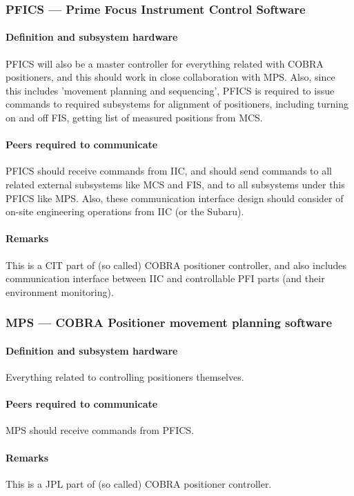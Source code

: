 \documentclass[a4paper,notitlepage]{article}
\begin{document}
\subsubsection{PFICS --- Prime Focus Instrument Control Software}
\paragraph{Definition and subsystem hardware}
PFICS will also be a master controller for everything related with COBRA 
positioners, and this should work in close collaboration with MPS. 
Also, since this includes 'movement planning and sequencing', PFICS is 
required to issue commands to required subsystems for alignment of 
positioners, including turning on and off FIS, getting list of measured 
positions from MCS. 
\paragraph{Peers required to communicate}
PFICS should receive commands from IIC, and should send commands to all related 
external subsystems like MCS and FIS, and to all subsystems under this PFICS 
like MPS. 
Also, these communication interface design should consider of on-site 
engineering operations from IIC (or the Subaru). 
\paragraph{Remarks}
This is a CIT part of (so called) COBRA positioner controller, and also 
includes communication interface between IIC and controllable PFI parts (and 
their environment monitoring). 

\subsubsection{MPS --- COBRA Positioner movement planning software}
\paragraph{Definition and subsystem hardware}
Everything related to controlling positioners themselves.
\paragraph{Peers required to communicate}
MPS should receive commands from PFICS. 
\paragraph{Remarks}
This is a JPL part of (so called) COBRA positioner controller.
\end{document}
